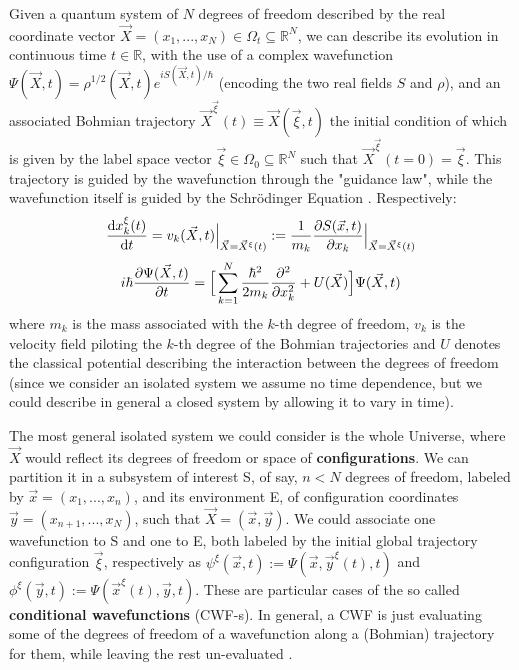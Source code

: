 \documentclass[11pt, a4paper]{article} %
\newcommand{\R}{\mathbb{R}} %
\begin{document}
Given a quantum system of $N$ degrees of freedom described by the real coordinate vector $\vec{X}=(x_1,...,x_N)\in\Omega_t\subseteq\R^N$, we can describe its evolution in continuous time $t\in\R$, with the use of a complex wavefunction $\Psi(\vec{X},t)=\rho^{1/2}(\vec{X},t)e^{iS(\vec{X},t)/\hbar}$ (encoding the two real fields $S$ and $\rho$), and an associated Bohmian trajectory $\vec{X}^{\vec{\xi}}(t)\equiv \vec{X}(\vec{\xi},t)$ the initial condition of which is given by the label space vector $\vec{\xi}\in\Omega_0\subseteq\R^N$ such that $\vec{X}^{\vec{\xi}}(t=0)=\vec{\xi}$. This trajectory is guided by the wavefunction through the "guidance law", while the wavefunction itself is guided by the Schrödinger Equation \cite{Bohm,Holland,Durr,JordiXavier}. Respectively:
\begin{equation}\label{GL}
\dv{x_k^\xi(t)}{t} = v_k(\vec{X},t)\Big\rvert_{\vec{X}=\vec{X}^\xi(t)}:=\frac{1}{m_k} \pdv{S(\vec{x},t)}{x_k}\Big\rvert_{\vec{X}=\vec{X}^\xi(t)}
\end{equation}
\begin{equation}\label{SE}
i\hbar\pdv{\Psi(\vec{X},t)}{t}=\Big[ \sum_{k=1}^N \frac{\hbar^2}{2m_k}\pdv[2]{}{x_k}+U(\vec{X})\Big]\Psi(\vec{X},t)
\end{equation}
where $m_k$ is the mass associated with the $k$-th degree of freedom, $v_k$ is the velocity field piloting the $k$-th degree of the Bohmian trajectories and $U$ denotes the classical potential describing the interaction between the degrees of freedom (since we consider an isolated system we assume no time dependence, but we could describe in general a closed system by allowing it to vary in time).

The most general isolated system we could consider is the whole Universe, where $\vec{X}$ would reflect its degrees of freedom or space of {\bf configurations}. We can partition it in a subsystem of interest S, of say, $n<N$ degrees of freedom, labeled by $\vec{x}=(x_1,...,x_n)$, and its environment E, of configuration coordinates $\vec{y}=(x_{n+1},...,x_N)$, such that $\vec{X}=(\vec{x},\vec{y})$. We could associate one wavefunction to S and one to E, both labeled by the initial global trajectory configuration $\vec{\xi}$, respectively as $\psi^\xi(\vec{x},t):=\Psi(\vec{x},\vec{y}^\xi(t),t)$ and $\phi^\xi(\vec{y},t):=\Psi(\vec{x}^\xi(t),\vec{y},t)$. These are particular cases of the so called {\bf conditional wavefunctions} (CWF-s). In general, a CWF is just evaluating some of the degrees of freedom of a wavefunction along a (Bohmian) trajectory for them, while leaving the rest un-evaluated \cite{Absolute, JordiXavier}.
\end{document}
